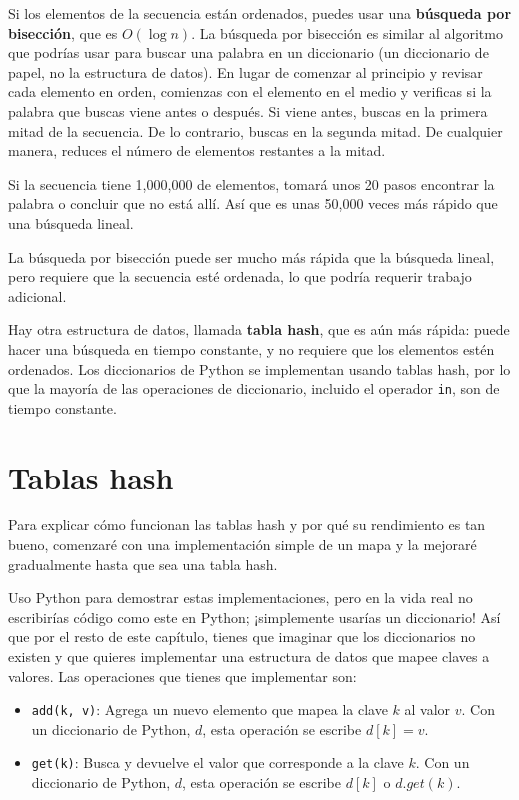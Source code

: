Si los elementos de la secuencia están ordenados, puedes usar una \textbf{búsqueda por bisección}, que es \( O(\log n) \). La búsqueda por bisección es similar al algoritmo que podrías usar para buscar una palabra en un diccionario (un diccionario de papel, no la estructura de datos). En lugar de comenzar al principio y revisar cada elemento en orden, comienzas con el elemento en el medio y verificas si la palabra que buscas viene antes o después. Si viene antes, buscas en la primera mitad de la secuencia. De lo contrario, buscas en la segunda mitad. De cualquier manera, reduces el número de elementos restantes a la mitad.

Si la secuencia tiene 1,000,000 de elementos, tomará unos 20 pasos encontrar la palabra o concluir que no está allí. Así que es unas 50,000 veces más rápido que una búsqueda lineal.

La búsqueda por bisección puede ser mucho más rápida que la búsqueda lineal, pero requiere que la secuencia esté ordenada, lo que podría requerir trabajo adicional.

Hay otra estructura de datos, llamada \textbf{tabla hash}, que es aún más rápida: puede hacer una búsqueda en tiempo constante, y no requiere que los elementos estén ordenados. Los diccionarios de Python se implementan usando tablas hash, por lo que la mayoría de las operaciones de diccionario, incluido el operador \texttt{in}, son de tiempo constante.

\section{Tablas hash}

Para explicar cómo funcionan las tablas hash y por qué su rendimiento es tan bueno, comenzaré con una implementación simple de un mapa y la mejoraré gradualmente hasta que sea una tabla hash.

Uso Python para demostrar estas implementaciones, pero en la vida real no escribirías código como este en Python; ¡simplemente usarías un diccionario! Así que por el resto de este capítulo, tienes que imaginar que los diccionarios no existen y que quieres implementar una estructura de datos que mapee claves a valores. Las operaciones que tienes que implementar son:

\begin{itemize}
    \item \texttt{add(k, v)}: Agrega un nuevo elemento que mapea la clave \( k \) al valor \( v \). Con un diccionario de Python, \( d \), esta operación se escribe \( d[k] = v \).
    \item \texttt{get(k)}: Busca y devuelve el valor que corresponde a la clave \( k \). Con un diccionario de Python, \( d \), esta operación se escribe \( d[k] \) o \( d.get(k) \).
\end{itemize}

